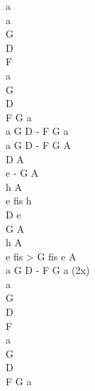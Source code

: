 \begin{chord}
a\\
a\\
G\\
D\\
F\\

a\\
G\\
D\\
F G a\\
a G D - F G a\\
a G D - F G A\\

D A\\
e - G A\\
h A\\
e fis h\\

D e\\
G A\\
h A\\
e fis > G fis e A\\
a G D - F G a (2x)\\

a\\
G\\
D\\
F\\

a\\
G\\
D\\
F G a\\
\end{chord}
